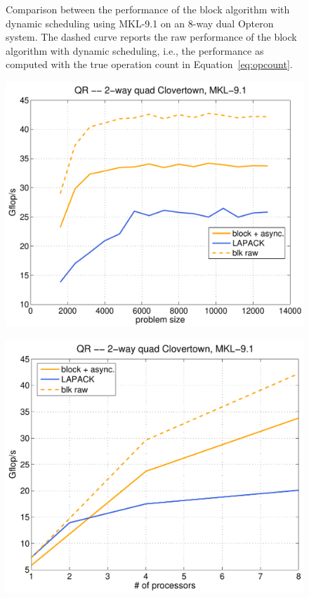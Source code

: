 \documentclass[runningheads]{llncs}
\begin{document}
\begin{figure}
\begin{minipage}[tr]{0.5\textwidth}
\begin{center}
\end{center}
\end{minipage}
\caption{\label{fig:mkl_opt}Comparison between the performance of the
block algorithm with dynamic scheduling using MKL-9.1 on an
8-way dual Opteron system. The dashed curve reports the
raw performance of the block algorithm with dynamic scheduling, i.e.,
the performance as computed with the true operation count in Equation~\eqref{eq:opcount}.}
\end{figure}

\begin{figure}
\begin{minipage}[tl]{0.5\textwidth}
\begin{center}
{\includegraphics[width=1\textwidth]{images/mkl_clov_8.pdf}}
\end{center}
\end{minipage}
\hspace{0.25cm}
\begin{minipage}[tr]{0.5\textwidth}
\begin{center}
{\includegraphics[width=1\textwidth]{images/mkl_clov_scal.pdf}}

\end{center}
\end{minipage}
\end{figure}
\end{document}
